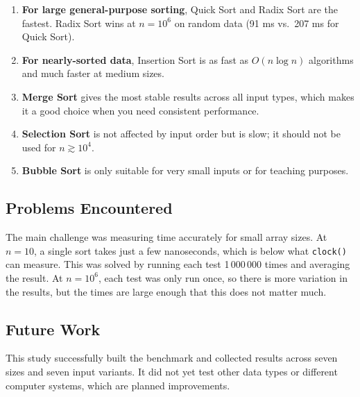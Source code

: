 \documentclass[12pt,a4paper]{article}
\theoremstyle{definition}
\begin{document}
\begin{enumerate}[noitemsep]
  \item \textbf{For large general-purpose sorting}, Quick Sort and Radix Sort are the fastest. Radix Sort wins at $n=10^6$ on random data (91 ms vs.\ 207 ms for Quick Sort).
  \item \textbf{For nearly-sorted data}, Insertion Sort is as fast as $O(n \log n)$ algorithms and much faster at medium sizes.
  \item \textbf{Merge Sort} gives the most stable results across all input types, which makes it a good choice when you need consistent performance.
  \item \textbf{Selection Sort} is not affected by input order but is slow; it should not be used for $n \gtrsim 10^4$.
  \item \textbf{Bubble Sort} is only suitable for very small inputs or for teaching purposes.
\end{enumerate}

\subsection{Problems Encountered}

The main challenge was measuring time accurately for small array sizes. At $n=10$, a single sort takes just a few nanoseconds, which is below what \texttt{clock()} can measure. This was solved by running each test 1\,000\,000 times and averaging the result. At $n=10^6$, each test was only run once, so there is more variation in the results, but the times are large enough that this does not matter much.

\subsection{Future Work}

This study successfully built the benchmark and collected results across seven sizes and seven input variants. It did not yet test other data types or different computer systems, which are planned improvements.
\end{document}
